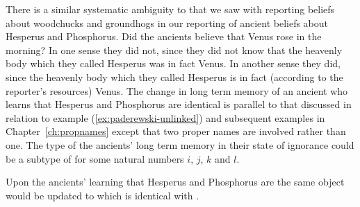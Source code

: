 There is a similar systematic ambiguity to that we saw with reporting
beliefs about woodchucks and groundhogs in our reporting of ancient
beliefs about Hesperus and Phosphorus.  Did the ancients believe that
Venus rose in the morning?  In one sense they did not, since they did
not know that the heavenly body which they called Hesperus was in fact
Venus.  In another sense they did, since the heavenly body which they
called Hesperus is in fact (according to the reporter's resources)
Venus.  The change in long term memory of an ancient who learns that
Hesperus and Phosphorus are identical is parallel to that discussed in
relation to example (\ref{ex:paderewski-unlinked}) and subsequent
examples in
Chapter~\ref{ch:propnames} except that two proper names are involved
rather than one.  The type of the ancients' long term memory in their
state of ignorance could be a subtype of \nexteg{} for some natural
numbers $i$, $j$, $k$ and $l$.
\begin{ex} 

\end{ex}
Upon the ancients' learning that Hesperus and Phosphorus are the same
object \preveg{} would be updated to  which is identical
with .
